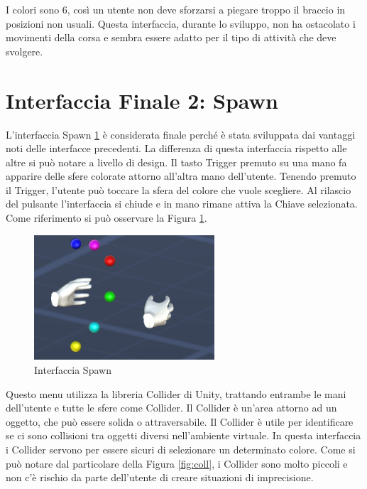 \documentclass[target=bach,aauheader=]{thud}
\begin{document}
I colori sono 6, così un utente non deve sforzarsi a piegare troppo il braccio in posizioni non usuali.
Questa interfaccia, durante lo sviluppo, non ha ostacolato i movimenti della corsa e sembra essere adatto per il tipo di attività che deve svolgere. 

\section{Interfaccia Finale 2: Spawn} %
\label{int_spawn}
L'interfaccia Spawn \ref{fig:spawn} è considerata finale perché è stata sviluppata dai vantaggi noti delle interfacce precedenti.
La differenza di questa interfaccia rispetto alle altre si può notare a livello di design.
Il tasto Trigger premuto su una mano fa apparire delle sfere colorate attorno all'altra mano dell'utente.
Tenendo premuto il Trigger, l'utente può toccare la sfera del colore che vuole scegliere.
Al rilascio del pulsante l'interfaccia si chiude e in mano rimane attiva la Chiave selezionata. 
Come riferimento si può osservare la Figura \ref{fig:spawn}. \\

\begin{figure}[h]
    \centering
    \includegraphics[width=0.60\textwidth]{spawn}
    \caption{Interfaccia Spawn}
    \label{fig:spawn}
\end{figure}

Questo menu utilizza la libreria Collider di Unity, trattando entrambe le mani dell'utente e tutte le sfere come Collider.
Il Collider è un'area attorno ad un oggetto, che può essere solida o attraversabile.
Il Collider è utile per identificare se ci sono collisioni tra oggetti diversi nell'ambiente virtuale.
In questa interfaccia i Collider servono per essere sicuri di selezionare un determinato colore.
Come si può notare dal particolare della Figura \ref{fig:coll}, i Collider sono molto piccoli e non c'è rischio da parte dell'utente di creare situazioni di imprecisione. \\
\end{document}
